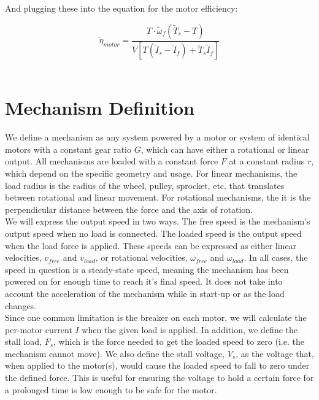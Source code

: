 \documentclass[a4paper]{article}
\begin{document}
	And plugging these into the equation for the motor efficiency:
	
	\begin{equation}
		\widetilde{\eta}_{motor} = \frac{T \cdot \widetilde{\omega}_f \left( \widetilde{T}_s - T \right)}{V \left[ T \left( \widetilde{I}_s - \widetilde{I}_f \right) + \widetilde{T}_s \widetilde{I}_f \right]}
	\end{equation}\\
	
	
	\section{Mechanism Definition}
	
	We define a mechanism as any system powered by a motor or system of identical motors with a constant gear ratio $ G $, which can have either a rotational or linear output. All mechanisms are loaded with a constant force $ F $ at a constant radius $ r $, which depend on the specific geometry and usage. For linear mechanisms, the load radius is the radius of the wheel, pulley, sprocket, etc. that translates between rotational and linear movement. For rotational mechanisms, the it is the perpendicular distance between the force and the axis of rotation.\\
	
	We will express the output speed in two ways. The free speed is the mechanism's output speed when no load is connected. The loaded speed is the output speed when the load force is applied. These speeds can be expressed as either linear velocities, $ v_{free} $ and $ v_{load} $, or rotational velocities, $ \omega_{free} $ and $ \omega_{load} $. In all cases, the speed in question is a steady-state speed, meaning the mechanism has been powered on for enough time to reach it's final speed. It does not take into account the acceleration of the mechanism while in start-up or as the load changes.\\
	
	Since one common limitation is the breaker on each motor, we will calculate the per-motor current $ I $ when the given load is applied. In addition, we define the stall load, $ F_s $, which is the force needed to get the loaded speed to zero (i.e. the mechanism cannot move). We also define the stall voltage, $ V_s $, as the voltage that, when applied to the motor(s), would cause the loaded speed to fall to zero under the defined force. This is useful for ensuring the voltage to hold a certain force for a prolonged time is low enough to be safe for the motor.\\
	
\end{document}
